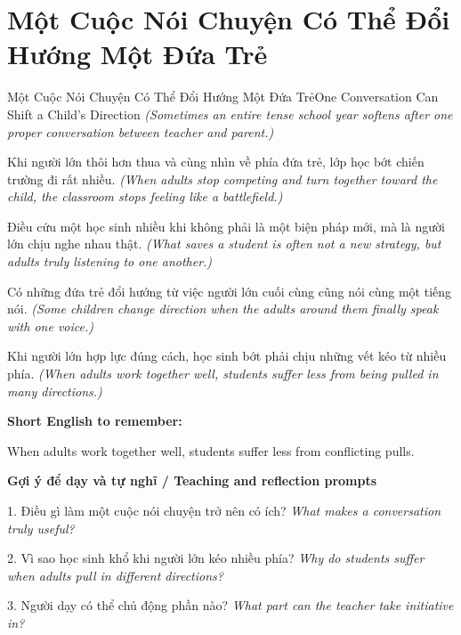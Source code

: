 \section{Một Cuộc Nói Chuyện Có Thể Đổi Hướng Một Đứa Trẻ}
\begin{truyen}{Một Cuộc Nói Chuyện Có Thể Đổi Hướng Một Đứa Trẻ}{One Conversation Can Shift a Child’s Direction}
\textit{(Sometimes an entire tense school year softens after one proper conversation between teacher and parent.)}

Khi người lớn thôi hơn thua và cùng nhìn về phía đứa trẻ, lớp học bớt chiến trường đi rất nhiều.
\textit{(When adults stop competing and turn together toward the child, the classroom stops feeling like a battlefield.)}

Điều cứu một học sinh nhiều khi không phải là một biện pháp mới, mà là người lớn chịu nghe nhau thật.
\textit{(What saves a student is often not a new strategy, but adults truly listening to one another.)}

Có những đứa trẻ đổi hướng từ việc người lớn cuối cùng cũng nói cùng một tiếng nói.
\textit{(Some children change direction when the adults around them finally speak with one voice.)}

\end{truyen}

\begin{baihoc}
Khi người lớn hợp lực đúng cách, học sinh bớt phải chịu những vết kéo từ nhiều phía.
\textit{(When adults work together well, students suffer less from being pulled in many directions.)}
\end{baihoc}

\begin{ghinhoanh}
\textbf{Short English to remember:}

When adults work together well, students suffer less from conflicting pulls.

\end{ghinhoanh}

\begin{tuhocnhanh}
\textbf{Gợi ý để dạy và tự nghĩ / Teaching and reflection prompts}

1. Điều gì làm một cuộc nói chuyện trở nên có ích? \textit{What makes a conversation truly useful?}

2. Vì sao học sinh khổ khi người lớn kéo nhiều phía? \textit{Why do students suffer when adults pull in different directions?}

3. Người dạy có thể chủ động phần nào? \textit{What part can the teacher take initiative in?}
\end{tuhocnhanh}
\ngancach

